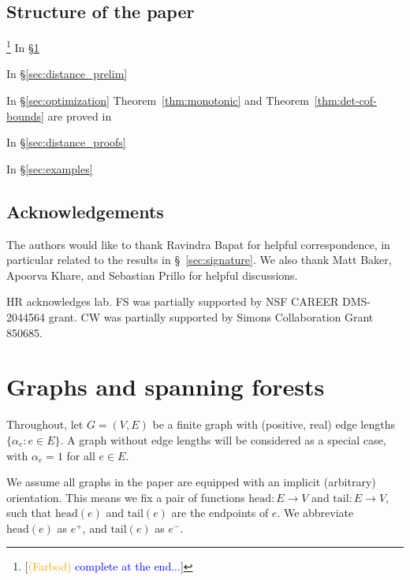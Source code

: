 \documentclass[12pt]{amsart}
\theoremstyle{definition}
\DeclareMathOperator{\conv}{conv}
\newcommand\farbod[1]{\footnote{[\textcolor{orange}{(Farbod)} \textcolor{blue}{#1}]}}
\begin{document}
\subsection*{Structure of the paper}\farbod{complete at the end...}
In \S\ref{sec:graphs-matrices}

In \S\ref{sec:distance_prelim}

In \S\ref{sec:optimization} 
Theorem~\ref{thm:monotonic} and Theorem~\ref{thm:det-cof-bounds} are proved in 




In \S\ref{sec:distance_proofs}

In \S\ref{sec:examples}



\subsection*{Acknowledgements}
The authors would like to thank Ravindra Bapat for helpful correspondence,
in particular related to the results in \S~\ref{sec:signature}. We also thank Matt Baker, Apoorva Khare, and Sebastian Prillo for helpful discussions.

 HR {\color{red}acknowledges lab}.
 FS was partially supported by NSF CAREER DMS-2044564 grant.
 CW was partially supported by Simons Collaboration Grant 850685.

\renewcommand*{\thethm}{\arabic{section}.\arabic{thm}}

\section{Graphs and spanning forests}
\label{sec:graphs-matrices}

Throughout, let $G = (V, E)$ be a finite graph with (positive, real) edge lengths $\{ \alpha_e \colon e \in E\}$. A graph without edge lengths will be considered as a special case, with $\alpha_e=1$ for all $e \in E$.

We assume all graphs in the paper are equipped with an implicit (arbitrary) orientation. This means we fix a pair of functions $\mathrm{head}\colon E \to V$ and $\mathrm{tail}\colon E \to V$, such that $\mathrm{head}(e)$ and $\mathrm{tail}(e)$ are the endpoints of $e$. We abbreviate $\mathrm{head}(e)$ as $e^+$, and $\mathrm{tail}(e)$ as $e^-$.

\end{document}
